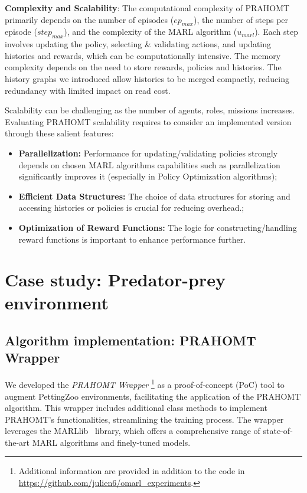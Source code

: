 \documentclass[runningheads]{llncs}
\theoremstyle{freethm}
\theoremstyle{proofoutline}
\newcounter{proof}
\begin{document}
\textbf{Complexity and Scalability}: \quad The computational complexity of PRAHOMT primarily depends on the number of episodes ($ep_{max}$), the number of steps per episode ($step_{max}$), and the complexity of the MARL algorithm ($u_{marl}$). Each step involves updating the policy, selecting \& validating actions, and updating histories and rewards, which can be computationally intensive. The memory complexity depends on the need to store rewards, policies and histories. The history graphs we introduced allow histories to be merged compactly, reducing redundancy with limited impact on read cost.

Scalability can be challenging as the number of agents, roles, missions increases. Evaluating PRAHOMT scalability requires to consider an implemented version through these salient features:
\begin{itemize}
    \item \textbf{Parallelization:} Performance for updating/validating policies strongly depends on chosen MARL algorithms capabilities such as parallelization significantly improves it (especially in Policy Optimization algorithms);
    \item \textbf{Efficient Data Structures:} The choice of data structures for storing and accessing histories or policies is crucial for reducing overhead.;
    \item \textbf{Optimization of Reward Functions:} The logic for constructing/handling reward functions is important to enhance performance further.
\end{itemize}




\section{Case study: Predator-prey environment}\label{sec:case_study}

\subsection{Algorithm implementation: PRAHOMT Wrapper}

We developed the \textit{PRAHOMT Wrapper}
%
\footnote{Additional information are provided in addition to the code in \url{https://github.com/julien6/omarl_experiments}.}
%
as a proof-of-concept (PoC) tool to augment PettingZoo environments, facilitating the application of the PRAHOMT algorithm. This wrapper includes additional class methods to implement PRAHOMT's functionalities, streamlining the training process. The wrapper leverages the MARLlib~\cite{hu2022marllib} library, which offers a comprehensive range of state-of-the-art MARL algorithms and finely-tuned models.
\end{document}

